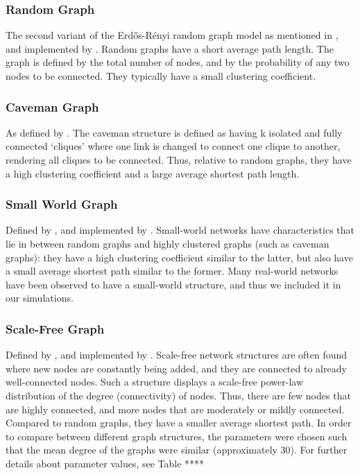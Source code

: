 \subsubsection{Random Graph}

The second variant of the Erd\H{o}s-R\'enyi random graph model \citep*{ER1960} as mentioned in \citet{Wiki}, and implemented by \citet*{BS2011}.
Random graphs have a short average path length. The graph is defined by the total number of nodes, and by the probability of any two nodes to be connected. They typically have a small clustering coefficient.

\subsubsection{Caveman Graph}

As defined by \citet*{W2003}.
The caveman structure is defined as having k isolated and fully connected `cliques' where one link is changed to connect one clique to another, rendering all cliques to be connected. Thus, relative to random graphs, they have a high clustering coefficient and a large average shortest path length.

\subsubsection{Small World Graph}

Defined by \citet*{WS1998}, and implemented by \citet*{BS2011}.
Small-world networks have characteristics that lie in between random graphs and highly clustered graphs (such as caveman graphs): they have a high clustering coefficient similar to the latter, but also have a small average shortest path similar to the former. Many real-world networks have been observed to have a small-world structure, and thus we included it in our simulations.

\subsubsection{Scale-Free Graph}

Defined by \citet*{BA1999}, and implemented by \citet*{BS2011}.
Scale-free network structures are often found where new nodes are constantly being added, and they are connected to already well-connected nodes. Such a structure displays a scale-free power-law distribution of the degree (connectivity) of nodes. Thus, there are few nodes that are highly connected, and more nodes that are moderately or mildly connected. Compared to random graphs, they have a smaller average shortest path.
In order to compare between different graph structures, the parameters were chosen such that the mean degree of the graphs were similar (approximately 30). For further details about parameter values, see Table ****

